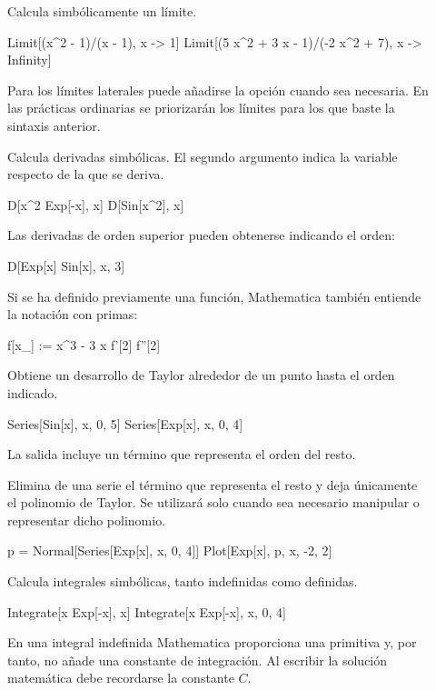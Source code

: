 \begin{description}

\item[] Calcula simbólicamente un límite.
\begin{mathematicacode}
Limit[(x^2 - 1)/(x - 1), x -> 1]
Limit[(5 x^2 + 3 x - 1)/(-2 x^2 + 7), x -> Infinity]
\end{mathematicacode}
Para los límites laterales puede añadirse la opción  cuando sea necesaria. En las prácticas ordinarias se priorizarán los límites para los que baste la sintaxis anterior.

\item[] Calcula derivadas simbólicas. El segundo argumento indica la variable respecto de la que se deriva.
\begin{mathematicacode}
D[x^2 Exp[-x], x]
D[Sin[x^2], x]
\end{mathematicacode}
Las derivadas de orden superior pueden obtenerse indicando el orden:
\begin{mathematicacode}
D[Exp[x] Sin[x], {x, 3}]
\end{mathematicacode}
Si se ha definido previamente una función, Mathematica también entiende la notación con primas:
\begin{mathematicacode}
f[x_] := x^3 - 3 x
f'[2]
f''[2]
\end{mathematicacode}

\item[] Obtiene un desarrollo de Taylor alrededor de un punto hasta el orden indicado.
\begin{mathematicacode}
Series[Sin[x], {x, 0, 5}]
Series[Exp[x], {x, 0, 4}]
\end{mathematicacode}
La salida incluye un término que representa el orden del resto.

\item[] Elimina de una serie el término que representa el resto y deja únicamente el polinomio de Taylor. Se utilizará solo cuando sea necesario manipular o representar dicho polinomio.
\begin{mathematicacode}
p = Normal[Series[Exp[x], {x, 0, 4}]]
Plot[{Exp[x], p}, {x, -2, 2}]
\end{mathematicacode}

\item[] Calcula integrales simbólicas, tanto indefinidas como definidas.
\begin{mathematicacode}
Integrate[x Exp[-x], x]
Integrate[x Exp[-x], {x, 0, 4}]
\end{mathematicacode}
En una integral indefinida Mathematica proporciona una primitiva y, por tanto, no añade una constante de integración. Al escribir la solución matemática debe recordarse la constante $C$.


\end{description}
